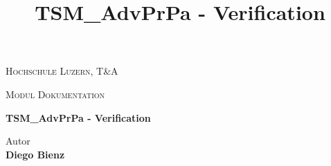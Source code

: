 
\begin{center}
\vspace{1.5cm}
{\scshape\LARGE Hochschule Luzern, T\&A \par}
{\scshape\Large Modul Dokumentation\par}
\vspace{2.0cm}
\title{TSM\_AdvPrPa - Verification}
{\huge\bfseries TSM\_AdvPrPa - Verification\par}

\vspace{16.0cm}

\end{center}

Autor \\
\textbf{Diego Bienz} \\


